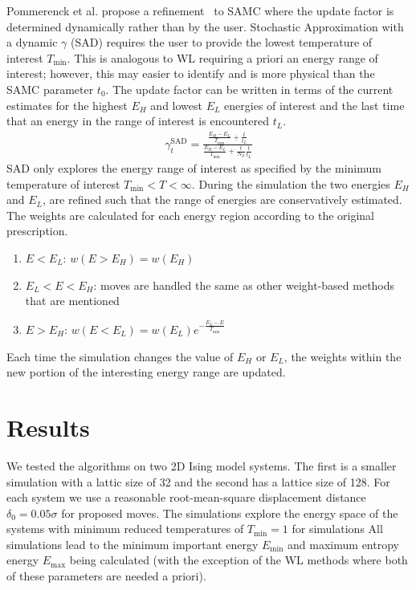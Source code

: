 \documentclass[letterpaper,twocolumn,amsmath,amssymb,pre,aps,10pt]{revtex4-1}
\begin{document}
Pommerenck et al. propose a refinement~\cite{pommerenck2020stochastic} to SAMC
where the update factor is determined dynamically rather than by the user.
Stochastic Approximation with a dynamic $\gamma$ (SAD) requires the user to
provide the lowest temperature of interest $T_{\min}$. This is analogous to WL
requiring a priori an energy range of interest; however, this may easier to
identify and is more physical than the SAMC parameter $t_0$. The update factor
can be written in terms of the current estimates for the highest $E_H$ and
lowest $E_L$ energies of interest and the last time that an energy in the range
of interest is encountered $t_L$.
\begin{align}
  \gamma_{t}^{\text{SAD}} =
     \frac{
       \frac{E_{H}-E_{L}}{T_{\text{min}}} + \frac{t}{t_L}
     }{
       \frac{E_{H}-E_{L}}{T_{\text{min}}} + \frac{t}{N_S}\frac{t}{t_L}
     }
\end{align}
SAD only explores the energy range of interest as specified by the minimum
temperature of interest $T_{\min} < T < \infty$. During the simulation the two
energies $E_H$ and $E_L$, are refined such that the range of energies are conservatively
estimated. The weights are calculated for each energy region according to the original
prescription.
\begin{enumerate}
\item {$E < E_L$:} $w(E>E_H) = w(E_H)$
\item {$E_L < E < E_H$:} moves are handled the same as other weight-based
methods that are mentioned
\item {$E > E_H$:} $w(E<E_L) = w(E_L)e^{-\frac{E_L-E}{T_{\min}}}$
\end{enumerate}
Each time the simulation changes the value of $E_H$ or $E_L$, the weights
within the new portion of the interesting energy range are updated.

\section{Results}
We tested the algorithms on two 2D Ising model systems.  The first is a smaller
simulation with a lattic size of 32 and the second has a lattice size of 128.
For each system we use a reasonable root-mean-square displacement distance
$\delta_0 = 0.05\sigma$ for proposed moves. The simulations explore the energy
space of the systems with minimum reduced temperatures of $T_{\text{min}} = 1$
for simulations All simulations lead to the minimum important energy $E_{\min}$
and maximum entropy energy $E_{\max}$ being calculated (with the exception of
the WL methods where both of these parameters are needed a priori).
\end{document}
